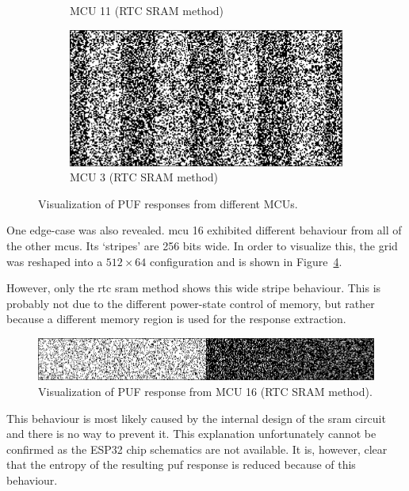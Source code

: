 \begin{figure}[ht!]
\begin{subfigure}[b]{0.475\textwidth}
            \caption{MCU 11 (RTC SRAM method)}    
            \label{fig:mcu_11}
        \end{subfigure}
        \hfill
        \begin{subfigure}[b]{0.475\textwidth}   
            \centering 
            \includegraphics[width=\textwidth]{images/3_response_rtc.png}
            \caption{MCU 3 (RTC SRAM method)}    
            \label{fig:mcu_3}
        \end{subfigure}
        \caption{Visualization of PUF responses from different MCUs.} 
        \label{fig:puf_response_visualization}
\end{figure}

One edge-case was also revealed. \Gls{mcu} 16 exhibited different behaviour from all of the other \glspl{mcu}. Its `stripes' are 256 bits wide. In order to visualize this, the grid was reshaped into a $512 \times 64$ configuration and is shown in Figure~\ref{fig:16_response_sleep}.

However, only the \gls{rtc} \gls{sram} method shows this wide stripe behaviour. This is probably not due to the different power-state control of memory, but rather because a different memory region is used for the response extraction.

\begin{figure}[ht!]
    \centering
    \captionsetup{justification=centering,margin=0.5cm}
    \includegraphics[width=\textwidth]{images/16_response_sleep.png}
    \caption{Visualization of PUF response from MCU 16 (RTC SRAM method).}
    \label{fig:16_response_sleep}
\end{figure}

This behaviour is most likely caused by the internal design of the \gls{sram} circuit and there is no way to prevent it. This explanation unfortunately cannot be confirmed as the ESP32 chip schematics are not available. It is, however, clear that the entropy of the resulting \gls{puf} response is reduced because of this behaviour.

